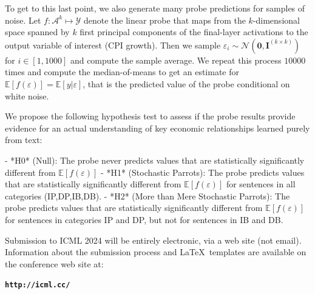 \documentclass{article}
\theoremstyle{plain}
\theoremstyle{definition}
\theoremstyle{remark}
\begin{document}
To get to this last point, we also generate many probe predictions for samples of noise. Let $f: \mathcal{A}^k \mapsto \mathcal{Y}$ denote the linear probe that maps from the $k$-dimensional space spanned by $k$ first principal components of the final-layer activations to the output variable of interest (CPI growth). Then we sample $\varepsilon_i \sim \mathcal{N}(\mathbf{0},\mathbf{I}^{(k \times k)})$ for $i \in [1,1000]$ and compute the sample average. We repeat this process $10000$ times and compute the median-of-means to get an estimate for $\mathbb{E}[f(\varepsilon)]=\mathbb{E}[y|\varepsilon]$, that is the predicted value of the probe conditional on white noise. 

We propose the following hypothesis test to assess if the probe results provide evidence for an actual understanding of key economic relationships learned purely from text:

- *H0* (Null): The probe never predicts values that are statistically significantly different from $\mathbb{E}[f(\varepsilon)]$
- *H1* (Stochastic Parrots): The probe predicts values that are statistically significantly different from $\mathbb{E}[f(\varepsilon)]$ for sentences in all categories (IP,DP,IB,DB).
- *H2* (More than Mere Stochastic Parrots): The probe predicts values that are statistically significantly different from $\mathbb{E}[f(\varepsilon)]$ for sentences in categories IP and DP, but not for sentences in IB and DB.









Submission to ICML 2024 will be entirely electronic, via a web site
(not email). Information about the submission process and \LaTeX\ templates
are available on the conference web site at:
\begin{center}
\textbf{\texttt{http://icml.cc/}}
\end{center}
\end{document}
